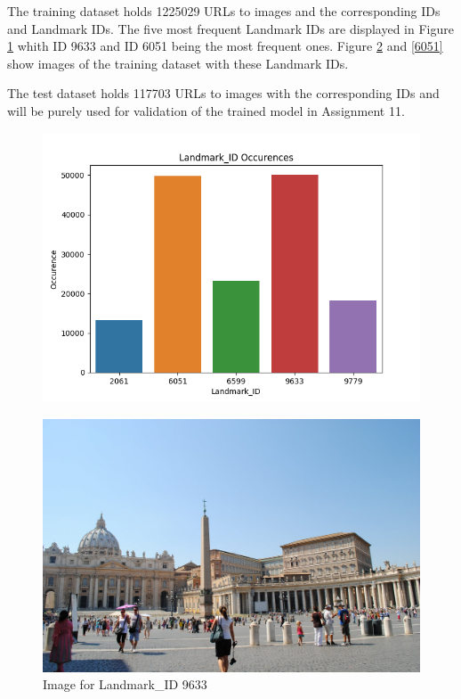 The training dataset holds 1225029 URLs to images and the corresponding IDs and Landmark IDs. The five most frequent Landmark IDs are displayed in Figure \ref{landmark-ids} whith ID 9633 and ID 6051 being the most frequent ones. Figure \ref{9633} and \ref{6051} show images of the training dataset with these Landmark IDs.

The test dataset holds 117703 URLs to images with the corresponding IDs and will be purely used for validation of the trained model in Assignment 11.

\begin{figure}
	\includegraphics[width=\textwidth]{images/Landmark_ID_occurences}
	\label{landmark-ids}
\end{figure}
	
\begin{figure}[t]
	\includegraphics[width=\textwidth]{images/9633}
	\caption{Image for Landmark\_ID 9633}
	\label{9633}
\end{figure}
	
